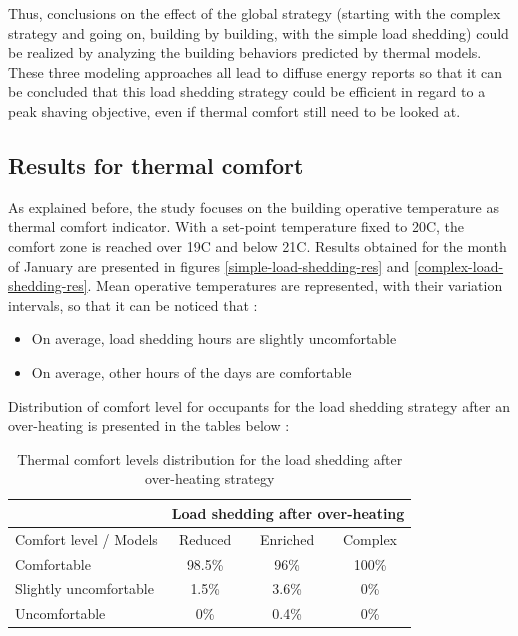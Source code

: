 \documentclass[buildings,article,submit,moreauthors,pdftex,10pt,a4paper]{mdpi}
\theoremstyle{mdpi}
\newcounter{ex}
\newcounter{re}
\theoremstyle{mdpidefinition}
\begin{document}
Thus, conclusions on the effect of the global strategy (starting with the complex strategy and going on, building by building, with the simple load shedding) could be realized by analyzing the building behaviors predicted by thermal models. These three modeling approaches all lead to diffuse energy reports so that it can be concluded that this load shedding strategy could be efficient in regard to a peak shaving objective, even if thermal comfort still need to be looked at.

\subsection{Results for thermal comfort}
As explained before, the study focuses on the building operative temperature as thermal comfort indicator. With a set-point temperature fixed to 20\textdegree{}C, the comfort zone is reached over 19\textdegree{}C and below 21\textdegree{}C. Results obtained for the month of January are presented in figures
\ref{simple-load-shedding-res}  and \ref{complex-load-shedding-res}.
Mean operative temperatures are represented, with their variation intervals, so that it can be noticed that :
\begin{itemize}[leftmargin=*,labelsep=4mm]
	\item On average, load shedding hours are slightly uncomfortable
	\item On average, other hours of the days are comfortable
\end{itemize}

Distribution of comfort level for occupants for the load shedding strategy after an over-heating is presented in the tables below : 
\begin{table}[H]
\centering
\caption{Thermal comfort levels distribution for the load shedding after over-heating strategy}
      \begin{tabular}{lccc}
      \hline
      & \multicolumn{3}{c}{Load shedding after over-heating} \\
      \hline
       Comfort level / Models & Reduced & Enriched & Complex \\
      Comfortable & 98.5\% & 96\% & 100\% \\
      Slightly uncomfortable & 1.5\% & 3.6\% & 0\% \\
     Uncomfortable & 0\% & 0.4\% & 0\% \\
     \hline
     \end{tabular}
\end{table}
\end{document}
